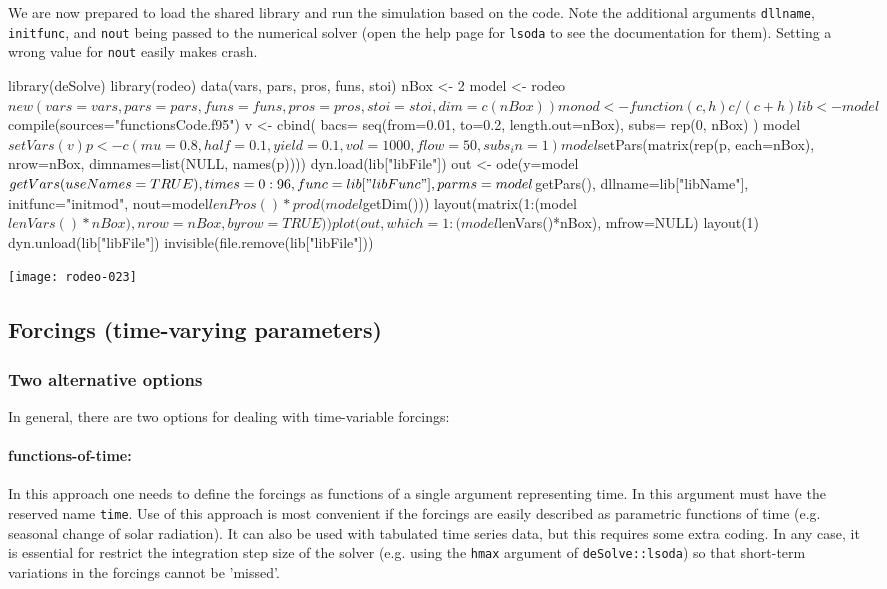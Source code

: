 \documentclass[onecolumn]{article}
\begin{document}
We are now prepared to load the shared library and run the simulation based on the  code. Note the additional arguments \verb|dllname|, \verb|initfunc|, and \verb|nout| being passed to the numerical solver (open the help page for \verb|lsoda| to see the documentation for them). Setting a wrong value for \verb|nout| easily makes  crash.

\begin{Schunk}
\begin{Sinput}
 library(deSolve)
 library(rodeo)
 data(vars, pars, pros, funs, stoi)
 nBox <- 2
 model <- rodeo$new(vars=vars, pars=pars, funs=funs,
   pros=pros, stoi=stoi, dim=c(nBox))
 monod <- function(c,h) { c / (c + h) }
 lib <- model$compile(sources="functionsCode.f95")
 v <- cbind(
   bacs= seq(from=0.01, to=0.2, length.out=nBox),
   subs= rep(0, nBox)
 )
 model$setVars(v)
 p <- c(mu=0.8, half=0.1, yield= 0.1,
   vol=1000, flow=50, subs_in=1)
 model$setPars(matrix(rep(p, each=nBox), nrow=nBox,
   dimnames=list(NULL, names(p))))
 dyn.load(lib["libFile"])
 out <- ode(y=model$getVars(useNames=TRUE), times=0:96,
   func=lib["libFunc"], parms=model$getPars(), dllname=lib["libName"],
   initfunc="initmod", nout=model$lenPros()*prod(model$getDim()))
 layout(matrix(1:(model$lenVars()*nBox), nrow=nBox, byrow=TRUE))
 plot(out, which=1:(model$lenVars()*nBox), mfrow=NULL)
 layout(1)
 dyn.unload(lib["libFile"])
 invisible(file.remove(lib["libFile"]))
\end{Sinput}
\end{Schunk}
\texttt{[image: rodeo-023]}


\subsection{Forcings (time-varying parameters)} \label{sec:advanced:forcings}

\subsubsection{Two alternative options}
In general, there are two options for dealing with time-variable forcings:

\paragraph{functions-of-time:} In this approach one needs to define the forcings as functions of a single argument representing time. In  this argument must have the reserved name \verb|time|. Use of this approach is most convenient if the forcings are easily described as parametric functions of time (e.g. seasonal change of solar radiation). It can also be used with tabulated time series data, but this requires some extra coding. In any case, it is essential for restrict the integration step size of the solver (e.g. using the \verb|hmax| argument of \verb|deSolve::lsoda|) so that short-term variations in the forcings cannot be 'missed'.
 
\end{document}
